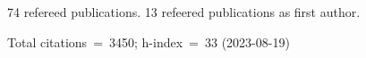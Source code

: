 74 refereed publications. 13 refeered publications as first author.

Total citations~=~3450; h-index~=~33 (2023-08-19)